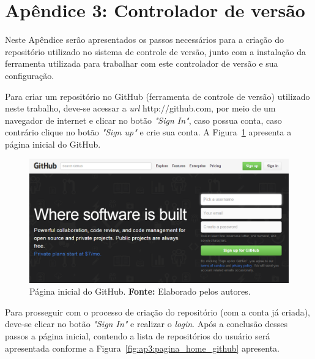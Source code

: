 \chapter*{Apêndice 3: Controlador de versão}
\label{ap3:github}

Neste Apêndice serão apresentados os passos necessários para a criação do repositório utilizado no sistema de controle de versão, junto com a instalação da ferramenta utilizada para trabalhar com este controlador de versão e sua configuração.

Para criar um repositório no GitHub (ferramenta de controle de versão) utilizado neste trabalho, deve-se acessar a  \textit{url} http://github.com, por meio de um navegador de internet e clicar no botão \textit{"Sign In"}, caso possua conta, caso contrário clique no botão \textit{"Sign up"} e crie sua conta. A Figura~\ref{fig:ap3:pagina_inicial_github} apresenta a página inicial do GitHub.

\captionsetup[figure]{list=no}
\begin{figure}[h!]
	\centerline{\includegraphics[scale=0.5]{./imagens/apendices/pagina-inicial-github.png}}
	\caption[Página inicial do GitHub.]
	{Página inicial do GitHub. \textbf{Fonte:} Elaborado pelos autores.}
	\label{fig:ap3:pagina_inicial_github}
\end{figure}

Para prosseguir com o processo de criação do repositório (com a conta já criada), deve-se clicar no botão \textit{"Sign In"} e realizar o \textit{login}. Após a conclusão desses passos a página inicial, contendo a lista de repositórios do usuário será apresentada conforme a Figura~\ref{fig:ap3:pagina_home_github} apresenta.

